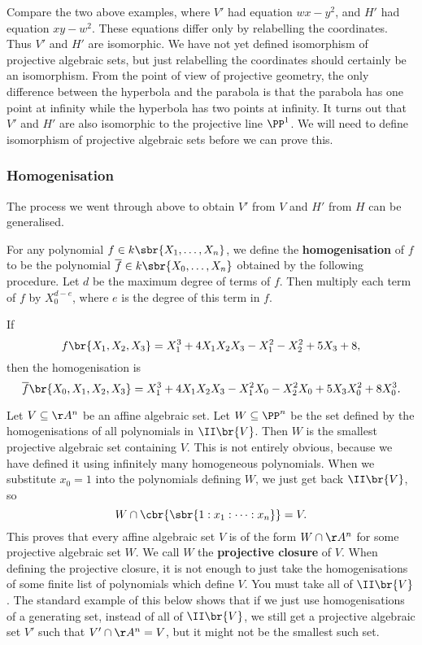 Compare the two above examples, where $ V' $ had equation $ wx - y^2 $, and $ H' $ had equation $ xy - w^2 $. These equations differ only by relabelling the coordinates. Thus $ V' $ and $ H' $ are isomorphic. We have not yet defined isomorphism of projective algebraic sets, but just relabelling the coordinates should certainly be an isomorphism. From the point of view of projective geometry, the only difference between the hyperbola and the parabola is that the parabola has one point at infinity while the hyperbola has two points at infinity. It turns out that $ V' $ and $ H' $ are also isomorphic to the projective line $ \PP^1 $. We will need to define isomorphism of projective algebraic sets before we can prove this.

\pagebreak

\subsubsection{Homogenisation}

The process we went through above to obtain $ V' $ from $ V $ and $ H' $ from $ H $ can be generalised.

\begin{definition*}
For any polynomial $ f \in k\sbr{X_1, \dots, X_n} $, we define the \textbf{homogenisation} of $ f $ to be the polynomial $ \overline{f} \in k\sbr{X_0, \dots, X_n} $ obtained by the following procedure. Let $ d $ be the maximum degree of terms of $ f $. Then multiply each term of $ f $ by $ X_0^{d - e} $, where $ e $ is the degree of this term in $ f $.
\end{definition*}

\begin{example*}
If
$$ f\br{X_1, X_2, X_3} = X_1^3 + 4X_1X_2X_3 - X_1^2 - X_2^2 + 5X_3 + 8, $$
then the homogenisation is
$$ \overline{f}\br{X_0, X_1, X_2, X_3} = X_1^3 + 4X_1X_2X_3 - X_1^2X_0 - X_2^2X_0 + 5X_3X_0^2 + 8X_0^3. $$
\end{example*}

Let $ V \subseteq \AA^n $ be an affine algebraic set. Let $ W \subseteq \PP^n $ be the set defined by the homogenisations of all polynomials in $ \II\br{V} $. Then $ W $ is the smallest projective algebraic set containing $ V $. This is not entirely obvious, because we have defined it using infinitely many homogeneous polynomials. When we substitute $ x_0 = 1 $ into the polynomials defining $ W $, we just get back $ \II\br{V} $, so
$$ W \cap \cbr{\sbr{1 : x_1 : \dots : x_n}} = V. $$
This proves that every affine algebraic set $ V $ is of the form $ W \cap \AA^n $ for some projective algebraic set $ W $. We call $ W $ the \textbf{projective closure} of $ V $. When defining the projective closure, it is not enough to just take the homogenisations of some finite list of polynomials which define $ V $. You must take all of $ \II\br{V} $. The standard example of this below shows that if we just use homogenisations of a generating set, instead of all of $ \II\br{V} $, we still get a projective algebraic set $ V' $ such that $ V' \cap \AA^n = V $, but it might not be the smallest such set.

